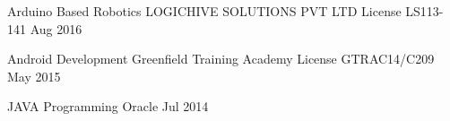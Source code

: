 

\begin{cvhonors}

  \cvhonor
    {Arduino Based Robotics} %
    {LOGICHIVE SOLUTIONS PVT LTD} %
    {License LS113-141} %
    { Aug 2016 } %

  \cvhonor
    {Android Development} %
    {Greenfield Training Academy} %
    {License GTRAC14/C209} %
    {May 2015} %

  \cvhonor
     {JAVA Programming } %
    {Oracle} %
    {} %
    {Jul 2014} %

\end{cvhonors}
